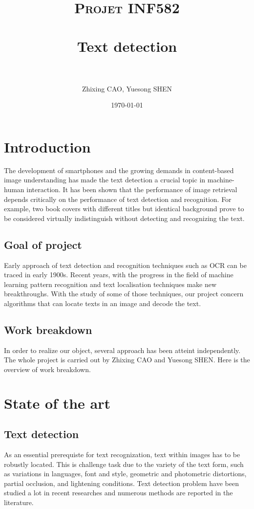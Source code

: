 \documentclass[paper=a4, french, 11pt]{scrartcl}
\title{	
\normalfont \normalsize 
\textsc{Projet INF582} \\ [25pt] 
\horrule{0.5pt} \\[0.5cm] %
\huge Text detection \\ %
\horrule{2pt} \\[0.5cm] %
}
\author{Zhixing CAO, Yuesong SHEN} %
\date{\normalsize\today} %
\begin{document}
\setlength\parindent{12pt}
\maketitle %

\section{Introduction}
The development of smartphones and the growing demands in content-based image understanding has made the text detection a crucial topic in machine-human interaction. It has been shown that the performance of image retrieval depends critically on the performance of text detection and recognition. For example, two book covers with different titles but identical background prove to be considered virtually indistinguish without detecting and recognizing the text.
\subsection{Goal of project}
Early approach of text detection and recognition techniques such as OCR can be traced in early 1900s. Recent years, with the progress in the field of machine learning pattern recognition and text localisation techniques make new breakthroughs. With the study of some of those techniques, our project concern algorithms that can locate texts in an image and decode the text.
\subsection{Work breakdown}
In order to realize our object, several approach has been atteint independently. The whole project is carried out by Zhixing CAO and Yuesong SHEN. Here is the overview of work breakdown.

 
\section{State of the art}
\subsection{Text detection}
As an essential prerequiste for text recognization, text within images has to be robustly located. This is challenge task due to the variety of the text form, such as variations in languages, font and style, geometric and photometric distortions, partial occlusion, and lightening conditions. Text detection problem have been studied a lot in recent researches and numerous methods are reported in the literature.
\end{document}
